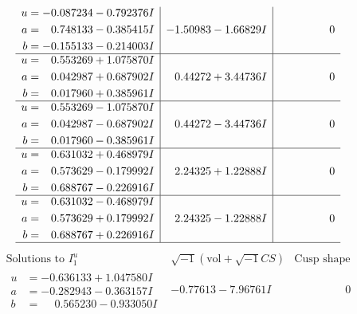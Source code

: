 \documentclass[1p]{elsarticle_modified}
\theoremstyle{definition}
\newcommand{\I}{\sqrt{-1}}
\begin{document}
$$\begin{array}{c|c|c}
\begin{aligned}
u &= -0.087234 - 0.792376 I \\
a &= \phantom{-}0.748133 - 0.385415 I \\
b &= -0.155133 - 0.214003 I\end{aligned}
 & -1.50983 - 1.66829 I & \phantom{-0.000000 } 0 \\ \hline\begin{aligned}
u &= \phantom{-}0.553269 + 1.075870 I \\
a &= \phantom{-}0.042987 + 0.687902 I \\
b &= \phantom{-}0.017960 + 0.385961 I\end{aligned}
 & \phantom{-}0.44272 + 3.44736 I & \phantom{-0.000000 } 0 \\ \hline\begin{aligned}
u &= \phantom{-}0.553269 - 1.075870 I \\
a &= \phantom{-}0.042987 - 0.687902 I \\
b &= \phantom{-}0.017960 - 0.385961 I\end{aligned}
 & \phantom{-}0.44272 - 3.44736 I & \phantom{-0.000000 } 0 \\ \hline\begin{aligned}
u &= \phantom{-}0.631032 + 0.468979 I \\
a &= \phantom{-}0.573629 - 0.179992 I \\
b &= \phantom{-}0.688767 - 0.226916 I\end{aligned}
 & \phantom{-}2.24325 + 1.22888 I & \phantom{-0.000000 } 0 \\ \hline\begin{aligned}
u &= \phantom{-}0.631032 - 0.468979 I \\
a &= \phantom{-}0.573629 + 0.179992 I \\
b &= \phantom{-}0.688767 + 0.226916 I\end{aligned}
 & \phantom{-}2.24325 - 1.22888 I & \phantom{-0.000000 } 0\\
 \hline 
 \end{array}$$\newpage$$\begin{array}{c|c|c}  
\text{Solutions to }I^u_{1}& \I (\text{vol} + \sqrt{-1}CS) & \text{Cusp shape}\\
 \hline 
\begin{aligned}
u &= -0.636133 + 1.047580 I \\
a &= -0.282943 - 0.363157 I \\
b &= \phantom{-}0.565230 - 0.933050 I\end{aligned}
 & -0.77613 - 7.96761 I & \phantom{-0.000000 } 0 \\ \hline\begin{aligned}

\end{aligned}
\end{array}$$
\end{document}

